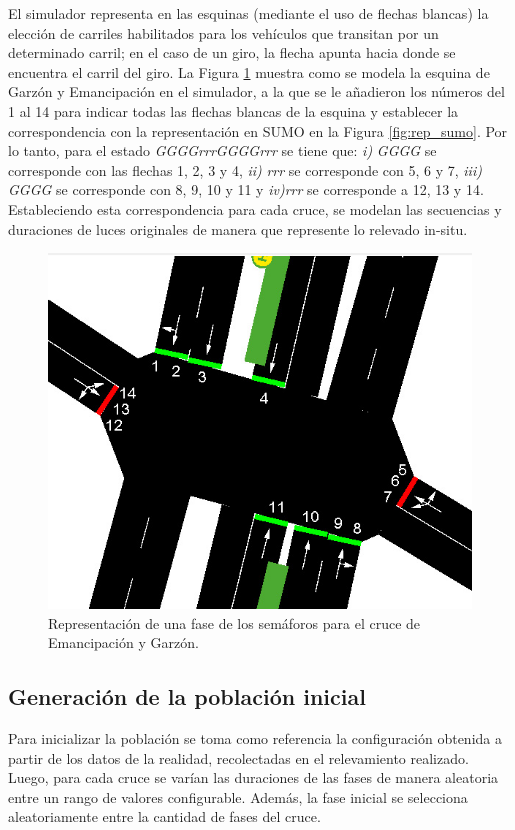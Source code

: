 \newpage

El simulador representa en las esquinas (mediante el uso de flechas blancas) la elección de carriles habilitados para los vehículos que transitan por un determinado carril; en el caso de un giro, la flecha apunta hacia donde se encuentra el carril del giro. La Figura \ref{fig:sem_numerados} muestra como se modela la esquina de Garzón y Emancipación en el simulador, a la que se le añadieron los números del 1 al 14 para indicar todas las flechas blancas de la esquina y establecer la correspondencia con la representación en SUMO en la Figura \ref{fig:rep_sumo}. Por lo tanto, para el estado \emph{GGGGrrrGGGGrrr} se tiene que: \textit{i)} \emph{GGGG} se corresponde con las flechas 1, 2, 3 y 4, \textit{ii)} \emph{rrr} se corresponde con 5, 6 y 7, \textit{iii)} \emph{GGGG} se corresponde con 8, 9, 10 y 11 y \textit{iv)}\emph{rrr} se corresponde a 12, 13 y 14. Estableciendo esta correspondencia para cada cruce, se modelan las secuencias y duraciones de luces originales de manera que represente lo relevado in-situ.

\begin{figure}[H]
	\centering
	\includegraphics[width=0.7\linewidth]{Figures/semaforos_numerado}
	\caption[Representación de una fase de los semáforos para un cruce.]{Representación de una fase de los semáforos para el cruce de Emancipación y Garzón.}
	\label{fig:sem_numerados}
\end{figure}


\newpage


\subsection{Generación de la población inicial}

Para inicializar la población se toma como referencia la configuración obtenida a partir de los datos de la realidad, recolectadas en el relevamiento realizado. Luego, para cada cruce se varían las duraciones de las fases de manera aleatoria entre un rango de valores configurable. Además, la fase inicial se selecciona aleatoriamente entre la cantidad de fases del cruce.

